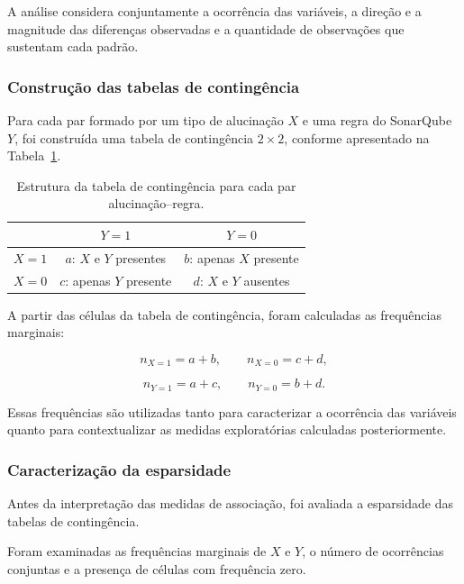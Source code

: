 A análise considera conjuntamente a ocorrência das variáveis, a direção e a magnitude das diferenças observadas e a quantidade de observações que sustentam cada padrão.

\subsubsection{Construção das tabelas de contingência}

Para cada par formado por um tipo de alucinação $X$ e uma regra do
SonarQube $Y$, foi construída uma tabela de contingência $2\times2$,
conforme apresentado na Tabela~\ref{tab:contingencia}.

\begin{table}[ht]
    \centering
    \caption{Estrutura da tabela de contingência para cada par
    alucinação--regra.}
    \label{tab:contingencia}
    \begin{tabular}{lcc}
        \hline
        & $Y=1$ & $Y=0$ \\ 
        \hline
        $X=1$ 
        & $a$: $X$ e $Y$ presentes
        & $b$: apenas $X$ presente \\

        $X=0$
        & $c$: apenas $Y$ presente
        & $d$: $X$ e $Y$ ausentes \\
        \hline
    \end{tabular}
\end{table}

A partir das células da tabela de contingência, foram calculadas as
frequências marginais:

\[
n_{X=1}=a+b,
\qquad
n_{X=0}=c+d,
\]

\[
n_{Y=1}=a+c,
\qquad
n_{Y=0}=b+d.
\]

Essas frequências são utilizadas tanto para caracterizar a ocorrência
das variáveis quanto para contextualizar as medidas exploratórias
calculadas posteriormente.

\subsubsection{Caracterização da esparsidade}\label{sec:esparcidade}

Antes da interpretação das medidas de associação, foi avaliada a
esparsidade das tabelas de contingência.

Foram examinadas as frequências marginais de $X$ e $Y$, o número de
ocorrências conjuntas e a presença de células com frequência zero.

